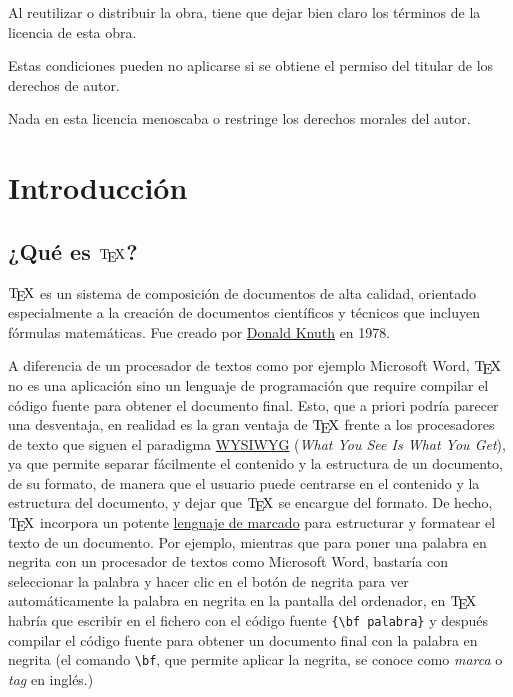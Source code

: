 \documentclass[
  a4paper,
]{scrreport}
\begin{document}
Al reutilizar o distribuir la obra, tiene que dejar bien claro los
términos de la licencia de esta obra.

Estas condiciones pueden no aplicarse si se obtiene el permiso del
titular de los derechos de autor.

Nada en esta licencia menoscaba o restringe los derechos morales del
autor.


\hypertarget{introducciuxf3n}{%
\chapter{Introducción}\label{introducciuxf3n}}

\hypertarget{quuxe9-es-texttex}{%
\section{\texorpdfstring{¿Qué es
\(\text{\TeX}\)?}{¿Qué es \textbackslash text\{\textbackslash TeX\}?}}\label{quuxe9-es-texttex}}

\(\text{\TeX}\) es un sistema de composición de documentos de alta
calidad, orientado especialmente a la creación de documentos científicos
y técnicos que incluyen fórmulas matemáticas. Fue creado por
\href{https://es.wikipedia.org/wiki/Donald_Knuth}{Donald Knuth} en 1978.

A diferencia de un procesador de textos como por ejemplo Microsoft Word,
\(\text{\TeX}\) no es una aplicación sino un lenguaje de programación
que require compilar el código fuente para obtener el documento final.
Esto, que a priori podría parecer una desventaja, en realidad es la gran
ventaja de \(\text{\TeX}\) frente a los procesadores de texto que siguen
el paradigma \href{https://es.wikipedia.org/wiki/WYSIWYG}{WYSIWYG}
(\emph{What You See Is What You Get}), ya que permite separar fácilmente
el contenido y la estructura de un documento, de su formato, de manera
que el usuario puede centrarse en el contenido y la estructura del
documento, y dejar que \(\text{\TeX}\) se encargue del formato. De
hecho, \(\text{\TeX}\) incorpora un potente
\href{https://es.wikipedia.org/wiki/Lenguaje_de_marcado}{lenguaje de
marcado} para estructurar y formatear el texto de un documento. Por
ejemplo, mientras que para poner una palabra en negrita con un
procesador de textos como Microsoft Word, bastaría con seleccionar la
palabra y hacer clic en el botón de negrita para ver automáticamente la
palabra en negrita en la pantalla del ordenador, en \(\text{\TeX}\)
habría que escribir en el fichero con el código fuente
\texttt{\{\textbackslash{}bf\ palabra\}} y después compilar el código
fuente para obtener un documento final con la palabra en negrita (el
comando \texttt{\textbackslash{}bf}, que permite aplicar la negrita, se
conoce como \emph{marca} o \emph{tag} en inglés.)
\end{document}
